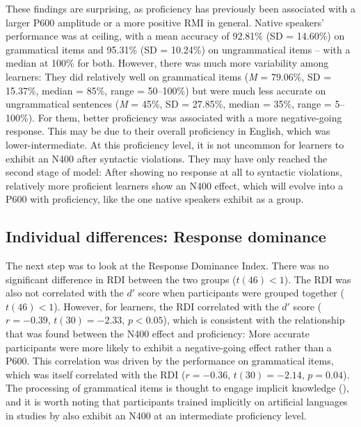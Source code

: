 \documentclass[output=paper,colorlinks,citecolor=brown,modfonts,nonflat]{../langscibook}
\begin{document}
These findings are surprising, as proficiency has previously been associated with a larger P600 amplitude or a more positive RMI in general. Native speakers’ performance was at ceiling, with a mean accuracy of 92.81\% (SD = 14.60\%) on grammatical items and 95.31\% (SD = 10.24\%) on ungrammatical items – with a median at 100\% for both. However, there was much more variability among learners: They did relatively well on grammatical items (\textit{M} = 79.06\%, SD = 15.37\%, median = 85\%, range = 50--100\%) but were much less accurate on ungrammatical sentences (\textit{M} = 45\%, SD = 27.85\%, median = 35\%, range = 5--100\%). For them, better proficiency was associated with a more negative-going response. This may be due to their overall proficiency in English, which was lower-intermediate. At this proficiency level, it is not uncommon for learners to exhibit an N400 after syntactic violations. They may have only reached the second stage of  model: After showing no response at all to syntactic violations, relatively more proficient learners show an N400 effect, which will evolve into a P600 with proficiency, like the one native speakers exhibit as a group.

\subsection{Individual differences: Response dominance}

The next step was to look at the Response Dominance Index. There was no significant difference in RDI between the two groups ($t(46) < 1$). The RDI was also not correlated with the $d′$ score when participants were grouped together ($t(46) < 1$). However, for learners, the RDI correlated with the $d′$ score ($r = -0.39$, $t(30) = -2.33$, $p < 0.05$), which is consistent with the relationship that was found between the N400 effect and proficiency: More accurate participants were more likely to exhibit a negative-going effect rather than a P600. This correlation was driven by the performance on grammatical items, which was itself correlated with the RDI ($r = -0.36$, $t(30) = -2.14$, $p = 0.04$). The processing of grammatical items is thought to engage implicit knowledge (\citealt{Roehr-Brackin2015}), and it is worth noting that participants trained implicitly on artificial languages in studies by \citet{Morgan-ShortEtAl2010,Morgan-ShortEtAl2012} also exhibit an N400 at an intermediate proficiency level.
\end{document}
